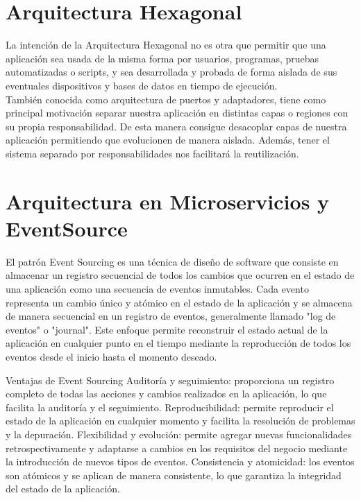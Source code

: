   \section{ Arquitectura  Hexagonal}
    La intenci\'on de la Arquitectura Hexagonal no es otra que permitir que una aplicaci\'on sea usada de la 
    misma forma por usuarios, programas, pruebas automatizadas o scripts, y sea desarrollada y probada de
     forma aislada de sus eventuales dispositivos y bases de datos en tiempo de ejecuci\'on.\\
      Tambi\'en conocida como arquitectura de puertos y adaptadores, tiene como principal motivaci\'on separar
       nuestra aplicaci\'on en distintas capas o regiones con su propia responsabilidad. De esta manera consigue
        desacoplar capas de nuestra aplicaci\'on permitiendo que evolucionen de manera aislada. Adem\'as, tener 
        el sistema separado por responsabilidades nos facilitar\'a la reutilizaci\'on.
\section{Arquitectura en Microservicios y EventSource}
El patrón Event Sourcing es una técnica de diseño de software que consiste en almacenar
 un registro secuencial de todos los cambios que ocurren en el estado de una aplicación 
 como una secuencia de eventos inmutables. Cada evento representa un cambio único y atómico
  en el estado de la aplicación y se almacena de manera secuencial en un registro de eventos,
   generalmente llamado "log de eventos" o "journal". Este enfoque permite reconstruir el estado
    actual de la aplicación en cualquier punto en el tiempo mediante la reproducción de todos los
     eventos desde el inicio hasta el momento deseado.
     
Ventajas de Event Sourcing
Auditoría y seguimiento: proporciona un registro completo de todas las acciones y cambios realizados en la aplicación, lo que facilita la auditoría y el seguimiento.
Reproducibilidad: permite reproducir el estado de la aplicación en cualquier momento y facilita la resolución de problemas y la depuración.
Flexibilidad y evolución: permite agregar nuevas funcionalidades retrospectivamente y adaptarse a cambios en los requisitos del negocio mediante la introducción de nuevos tipos de eventos.
Consistencia y atomicidad: los eventos son atómicos y se aplican de manera consistente, lo que garantiza la integridad del estado de la aplicación.

